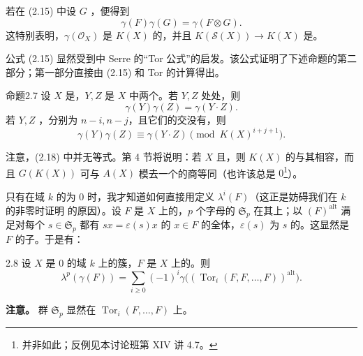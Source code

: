 若在 (2.15) 中设 $G$ ，便得到
\[
\gamma(F)\gamma(G)=\gamma(F\otimes G).\tag{2.15 bis}
\]
这特别表明，$\gamma(\mathcal O_X)$ 是 $K(X)$ 的，并且 $K(\mathscr S(X))\to K(X)$ 是。

公式 (2.15) 显然受到中 Serre 的“Tor 公式”的启发。该公式证明了下述命题的第二部分；第一部分直接由 (2.15) 和 Tor 的计算得出。
\begin{SGAresult}{命题}{2.7}
设 $X$ 是，$Y,Z$ 是 $X$ 中两个。若 $Y,Z$ 处处，则
\[
\gamma(Y)\gamma(Z)=\gamma(Y\cdot Z).\tag{2.17}
\]
若 $Y,Z$ ，分别为 $n-i,n-j$，且它们的交没有，则
\[
\gamma(Y)\gamma(Z)\equiv\gamma(Y\cdot Z)\pmod {K(X)^{i+j+1}}.\tag{2.18}
\]
\end{SGAresult}
注意，(2.18) 中并无等式。第 4 节将说明：若 $X$ 且，则 $K(X)$ 的与其相容，而且 $G(K(X))$ 可与 $A(X)$ 模去一个的商等同（也许该总是 $0$\footnote{并非如此；反例见本讨论班第 XIV 讲 4.7。}）。

只有在域 $k$ 的为 $0$ 时，我才知道如何直接用定义 $\lambda^i(F)$（这正是妨碍我们在 $k$ 的非零时证明 的原因）。设 $F$ 是 $X$ 上的，$p$ 个字母的 $\mathfrak S_p$ 在其上；以 $(F)^{\mathrm{alt}}$ 满足对每个 $s\in\mathfrak S_p$ 都有 $sx=\varepsilon(s)x$ 的 $x\in F$ 的全体，$\varepsilon(s)$ 为 $s$ 的。这显然是 $F$ 的子。于是有：
\begin{SGAresult}{}{2.8}
设 $X$ 是 $0$ 的域 $k$ 上的簇，$F$ 是 $X$ 上的。则
\[
\lambda^p(\gamma(F))=\sum_{i\geq0}(-1)^i\gamma\bigl((\operatorname{Tor}_i(F,F,\ldots,F))^{\mathrm{alt}}\bigr).\tag{2.19}
\]
\end{SGAresult}
\textbf{注意。} 群 $\mathfrak S_p$ 显然在 $\operatorname{Tor}_i(F,\ldots,F)$ 上。

